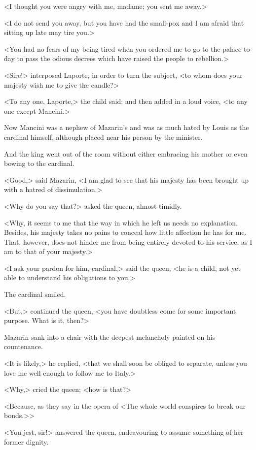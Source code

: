 <I thought you were angry with me, madame; you sent me away.>

<I do not send you away, but you have had the small-pox and I am afraid that sitting up late may tire you.>

<You had no fears of my being tired when you ordered me to go to the palace to-day to pass the odious decrees which have raised the people to rebellion.>

<Sire!> interposed Laporte, in order to turn the subject, <to whom does your majesty wish me to give the candle?>

<To any one, Laporte,> the child said; and then added in a loud voice, <to any one except Mancini.>

Now Mancini was a nephew of Mazarin's and was as much hated by Louis as the cardinal himself, although placed near his person by the minister.

And the king went out of the room without either embracing his mother or even bowing to the cardinal.

<Good,> said Mazarin, <I am glad to see that his majesty has been brought up with a hatred of dissimulation.>

<Why do you say that?> asked the queen, almost timidly.

<Why, it seems to me that the way in which he left us needs no explanation. Besides, his majesty takes no pains to conceal how little affection he has for me. That, however, does not hinder me from being entirely devoted to his service, as I am to that of your majesty.>

<I ask your pardon for him, cardinal,> said the queen; <he is a child, not yet able to understand his obligations to you.>

The cardinal smiled.

<But,> continued the queen, <you have doubtless come for some important purpose. What is it, then?>

Mazarin sank into a chair with the deepest melancholy painted on his countenance.

<It is likely,> he replied, <that we shall soon be obliged to separate, unless you love me well enough to follow me to Italy.>

<Why,> cried the queen; <how is that?>

<Because, as they say in the opera of  <The whole world conspires to break our bonds.>>

<You jest, sir!> answered the queen, endeavouring to assume something of her former dignity.


